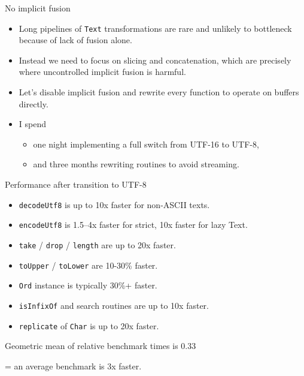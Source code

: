\documentclass[handout]{beamer}
\begin{document}
\begin{frame}[fragile]{No implicit fusion}

\begin{itemize}[<+->]
\item Long pipelines
      of {\tt Text} transformations are rare and unlikely to bottleneck because
      of lack of fusion alone.
\item Instead we need to focus on slicing and concatenation,
      which are precisely where uncontrolled implicit fusion is harmful.
\item Let's disable implicit fusion and rewrite
      every function to operate on buffers directly.
\item I spend
  \begin{itemize}
  \item one night implementing a full switch from UTF-16 to UTF-8,
  \item and three months
      rewriting routines to avoid streaming.
  \end{itemize}
\end{itemize}

\end{frame}

\begin{frame}{Performance after transition to UTF-8}

\begin{itemize}
\item {\tt decodeUtf8} is up to 10x faster for non-ASCII texts.
\pause
\item {\tt encodeUtf8} is 1.5--4x faster for strict, 10x faster for lazy Text.
\pause
\item {\tt take} / {\tt drop} / {\tt length} are up to 20x faster.
\pause
\item {\tt toUpper} / {\tt toLower} are 10-30\% faster.
\pause
\item {\tt Ord} instance is typically 30\%+ faster.
\pause
\item {\tt isInfixOf} and search routines are up to 10x faster.
\pause
\item {\tt replicate} of {\tt Char} is up to 20x faster.
\end{itemize}

\bigskip
\pause

Geometric mean of relative benchmark times is 0.33
\par \hfill = an average benchmark is 3x faster.

\end{frame}
\end{document}
